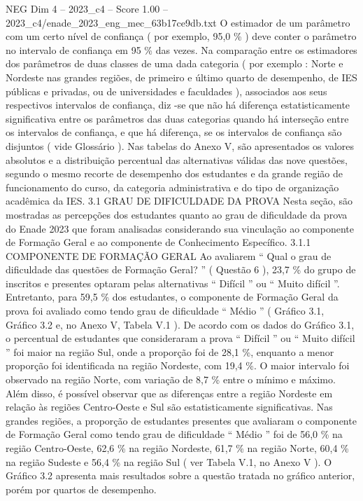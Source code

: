 \begin{textsample}{NEG Dim 4 – 2023\_c4 – Score 1.00 – 2023\_c4/enade\_2023\_eng\_mec\_63b17ce9db.txt}
O estimador de um parâmetro com um certo nível de confiança ( por exemplo, 95,0 \% ) deve conter o parâmetro no intervalo de confiança em 95 \% das vezes.
Na comparação entre os estimadores dos parâmetros de duas classes de uma dada categoria ( por exemplo : Norte e Nordeste nas grandes regiões, de primeiro e último quarto de desempenho, de IES públicas e privadas, ou de universidades e faculdades ), associados aos seus respectivos intervalos de confiança, diz -se que não há diferença estatisticamente significativa entre os parâmetros das duas categorias quando há interseção entre os intervalos de confiança, e que há diferença, se os intervalos de confiança são disjuntos ( vide Glossário ).
Nas tabelas do Anexo V, são apresentados os valores absolutos e a distribuição percentual das alternativas válidas das nove questões, segundo o mesmo recorte de desempenho dos estudantes e da grande região de funcionamento do curso, da categoria administrativa e do tipo de organização acadêmica da IES. 3.1 GRAU DE DIFICULDADE DA PROVA Nesta seção, são mostradas as percepções dos estudantes quanto ao grau de dificuldade da prova do Enade 2023 que foram analisadas considerando sua vinculação ao componente de Formação Geral e ao componente de Conhecimento Específico. 3.1.1 COMPONENTE DE FORMAÇÃO GERAL Ao avaliarem “ Qual o grau de dificuldade das questões de Formação Geral? ” ( Questão 6 ), 23,7 \% do grupo de inscritos e presentes optaram pelas alternativas “ Difícil ” ou “ Muito difícil ”.
Entretanto, para 59,5 \% dos estudantes, o componente de Formação Geral da prova foi avaliado como tendo grau de dificuldade “ Médio ” ( Gráfico 3.1, Gráfico 3.2 e, no Anexo V, Tabela V.1 ).
De acordo com os dados do Gráfico 3.1, o percentual de estudantes que consideraram a prova “ Difícil ” ou “ Muito difícil ” foi maior na região Sul, onde a proporção foi de 28,1 \%, enquanto a menor proporção foi identificada na região Nordeste, com 19,4 \%.
O maior intervalo foi observado na região Norte, com variação de 8,7 \% entre o mínimo e máximo.
Além disso, é possível observar que as diferenças entre a região Nordeste em relação às regiões Centro-Oeste e Sul são estatisticamente significativas.
Nas grandes regiões, a proporção de estudantes presentes que avaliaram o componente de Formação Geral como tendo grau de dificuldade “ Médio ” foi de 56,0 \% na região Centro-Oeste, 62,6 \% na região Nordeste, 61,7 \% na região Norte, 60,4 \% na região Sudeste e 56,4 \% na região Sul ( ver Tabela V.1, no Anexo V ).
O Gráfico 3.2 apresenta mais resultados sobre a questão tratada no gráfico anterior, porém por quartos de desempenho.

\end{textsample}
